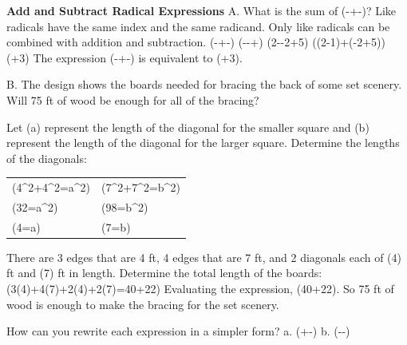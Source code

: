 \documentclass{article}
\newenvironment{example}[1]{}{}         %
\newenvironment{tryit}[1]{}{}           %
\newcommand{\answer}[1]{}               %
\newcommand{\placeholder}[2]{}          %
\newcommand{\te}[1]{}                   %
\begin{document}
\begin{example}{4}
\textbf{Add and Subtract Radical Expressions}
A. What is the sum of (-+-)?
Like radicals have the same index and the same radicand. Only like radicals can be combined with addition and subtraction.
(-+-)
(--+)
(2--2+5)
((2-1)+(-2+5))
(+3)
The expression (-+-) is equivalent to (+3).
\answer{A. (\sqrt5+3\sqrt[3]{2})}
\te{Callout: Factor out the radicals with the Distributive Property. STUDY TIP Use the inverse of the Distributive Property to combine like radicals in the same way that you would combine like terms.}
B. The design shows the boards needed for bracing the back of some set scenery. Will 75 ft of wood be enough for all of the bracing?
\placeholder{illustration}{People building stage scenery with a ship behind them. Two adjacent square wooden panels are shown in perspective, smaller on left and larger on right. Smaller panel bottom is labeled 4 ft and larger panel bottom 7 ft. Each has both diagonals drawn as white braces. The lower 4 ft of their common vertical edge is shared.}
Let (a) represent the length of the diagonal for the smaller square and (b) represent the length of the diagonal for the larger square. Determine the lengths of the diagonals:
\begin{tabular}{ll}
(4^2+4^2=a^2) & (7^2+7^2=b^2) \\
(32=a^2) & (98=b^2) \\
(4\sqrt2=a) & (7\sqrt2=b) \\
\end{tabular}
\te{Callout: Take the square root of both sides of the equation and simplify the radical. Since the context is length, the negative solution may be disregarded. APPLICATION.}
There are 3 edges that are 4 ft, 4 edges that are 7 ft, and 2 diagonals each of (4) ft and (7) ft in length. Determine the total length of the boards:
(3(4)+4(7)+2(4)+2(7)=40+22)
Evaluating the expression, (40+22).
So 75 ft of wood is enough to make the bracing for the set scenery.
\answer{B. Yes; (40+22\sqrt2\approx71.1) ft.}
\end{example}
\begin{tryit}{4}
How can you rewrite each expression in a simpler form?
a. (+-)
b. (--)
\answer{a. (\sqrt2+6\sqrt[3]{2}). b. (-3\sqrt5-10\sqrt6).}
\end{tryit}
\end{document}
